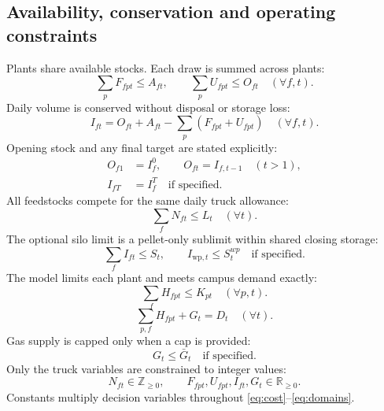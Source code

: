 \documentclass[11pt,a4paper]{article}
\begin{document}
\subsection{Availability, conservation and operating constraints}
Plants share available stocks. Each draw is summed across plants:
\begin{equation}\label{eq:avail}
\sum_p F_{fpt}\le A_{ft},\qquad \sum_p U_{fpt}\le O_{ft}\quad(\forall f,t).
\end{equation}
Daily volume is conserved without disposal or storage loss:
\begin{equation}\label{eq:stock}
I_{ft}=O_{ft}+A_{ft}-\sum_p(F_{fpt}+U_{fpt})\quad(\forall f,t).
\end{equation}
Opening stock and any final target are stated explicitly:
\begin{equation}\label{eq:boundary}
\begin{aligned}
O_{f1}&=I_f^0,\qquad O_{ft}=I_{f,t-1}\quad(t>1),\\
I_{fT}&=I_f^T\quad\text{if specified}.
\end{aligned}
\end{equation}
All feedstocks compete for the same daily truck allowance:
\begin{equation}\label{eq:trucks}
\sum_f N_{ft}\le L_t\quad(\forall t).
\end{equation}
The optional silo limit is a pellet-only sublimit within shared closing storage:
\begin{equation}\label{eq:storage}
\sum_f I_{ft}\le S_t,\qquad I_{\mathrm{wp},t}\le S^{wp}_t\quad\text{if specified}.
\end{equation}
The model limits each plant and meets campus demand exactly:
\begin{equation}\label{eq:plant}
\sum_f H_{fpt}\le K_{pt}\quad(\forall p,t).
\end{equation}
\begin{equation}\label{eq:demand}
\sum_{p,f}H_{fpt}+G_t=D_t\quad(\forall t).
\end{equation}
Gas supply is capped only when a cap is provided:
\begin{equation}\label{eq:gas}
G_t\le\bar G_t\quad\text{if specified}.
\end{equation}
Only the truck variables are constrained to integer values:
\begin{equation}\label{eq:domains}
N_{ft}\in\mathbb Z_{\ge0},\qquad F_{fpt},U_{fpt},I_{ft},G_t\in\mathbb R_{\ge0}.
\end{equation}
Constants multiply decision variables throughout \eqref{eq:cost}--\eqref{eq:domains}.
\end{document}

